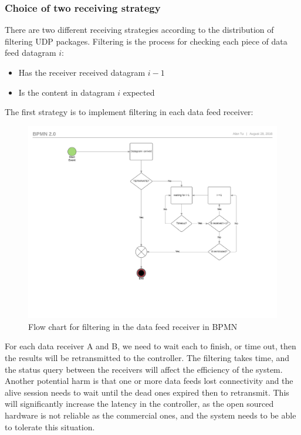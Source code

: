 \documentclass[11pt,openright,a4paper]{report}
\begin{document}
\subsubsection{Choice of two receiving strategy}
There are two different receiving strategies according to the distribution of filtering UDP packages. Filtering is the process for checking each piece of data feed datagram $i$: 
\begin{itemize}
	\item Has the receiver received datagram $i-1$
	\item Is the content in datagram $i$ expected
\end{itemize}
The first strategy is to implement filtering in each data feed receiver:
\begin{figure}[H]
\centering
\includegraphics[width=1.0\linewidth]{picture/Stg_1Recv}
\caption{Flow chart for filtering in the data feed receiver in BPMN}
\label{fig:Stg_1Recv}
\end{figure}
For each data receiver A and B, we need to wait each to finish, or time out, then the results will be retransmitted to the controller. The filtering takes time, and the status query between the receivers will affect the efficiency of the system. Another potential harm is that one or more data feeds lost connectivity and the alive session needs to wait until the dead ones expired then to retransmit. This will significantly increase the latency in the controller, as the open sourced hardware is not reliable as the commercial ones, and the system needs to be able to tolerate this situation.\\
\end{document}
